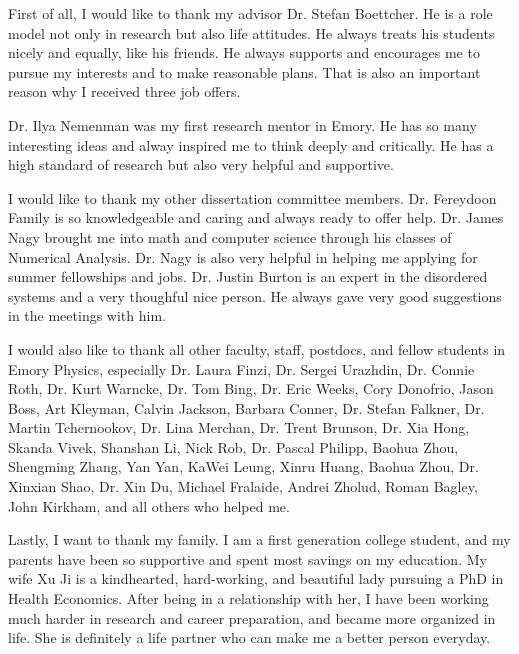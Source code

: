 \makecovertwo

\begin{acknowledgements}
First of all, I would like to thank my advisor Dr. Stefan Boettcher. He is a role model not only in research but also life attitudes. He always treats his students nicely and equally, like his friends. He always supports and encourages me to pursue my interests and to make reasonable plans. That is also an important reason why I received three job offers.  

Dr. Ilya Nemenman was my first research mentor in Emory. He has so many interesting ideas and alway inspired me to think deeply and critically. He has a high standard of research but also very helpful and supportive.

I would like to thank my other dissertation committee members. Dr. Fereydoon Family is so knowledgeable and caring and always ready to offer help. Dr. James Nagy brought me into math and computer science through his classes of Numerical Analysis. Dr. Nagy is also very helpful in helping me applying for summer fellowships and jobs.  Dr. Justin Burton is an expert in the disordered systems and a very thoughful nice person. He always gave very good suggestions in the meetings with him.  

I would also like to thank all other faculty, staff, postdocs, and fellow students in Emory Physics, especially Dr. Laura Finzi, Dr. Sergei Urazhdin, Dr. Connie Roth, Dr. Kurt Warncke, Dr. Tom Bing, Dr. Eric Weeks, Cory Donofrio, Jason Boss, Art Kleyman, Calvin Jackson, Barbara Conner, Dr. Stefan Falkner, Dr. Martin Tchernookov, Dr. Lina Merchan, Dr. Trent Brunson, Dr. Xia Hong, Skanda Vivek, Shanshan Li, Nick Rob, Dr. Pascal Philipp, Baohua Zhou, Shengming Zhang, Yan Yan, KaWei Leung, Xinru Huang, Baohua Zhou, Dr. Xinxian Shao, Dr. Xin Du, Michael Fralaide, Andrei Zholud, Roman Bagley, John Kirkham, and all others who helped me.

Lastly, I want to thank my family. I am a first generation college student, and my parents have been so supportive and spent most savings on my education. My wife Xu Ji is a kindhearted, hard-working, and beautiful lady pursuing a PhD in Health Economics. After being in a relationship with her, I have been working much harder in research and career preparation, and became more organized in life. She is definitely a life partner who can make me a better person everyday.



\end{acknowledgements}
\thesistableofcontents
\thesislistoftables
\thesislistoffigures

